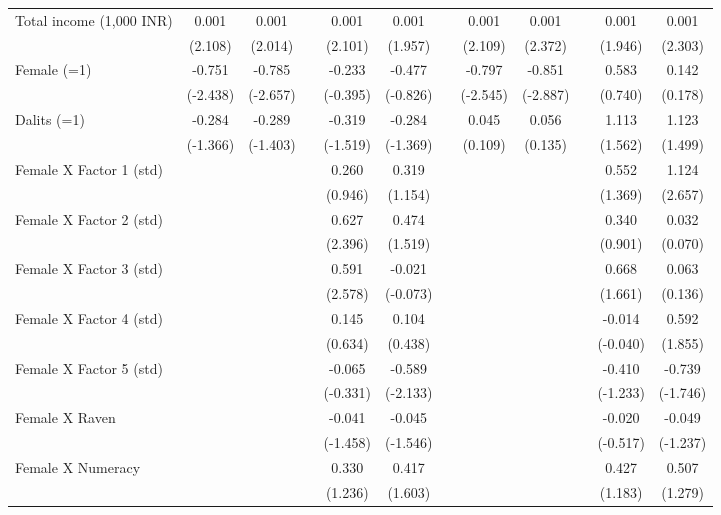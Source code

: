 {\begin{longtable}{@{\extracolsep{\fill}}lccccccccccc}
    Total income (1,000 INR) & 0.001 & 0.001 &   & 0.001 & 0.001 &   & 0.001 & 0.001 &   & 0.001 & 0.001 \\
      & (2.108) & (2.014) &   & (2.101) & (1.957) &   & (2.109) & (2.372) &   & (1.946) & (2.303) \\
    Female (=1) & -0.751 & -0.785 &   & -0.233 & -0.477 &   & -0.797 & -0.851 &   & 0.583 & 0.142 \\
      & (-2.438) & (-2.657) &   & (-0.395) & (-0.826) &   & (-2.545) & (-2.887) &   & (0.740) & (0.178) \\
    Dalits (=1) & -0.284 & -0.289 &   & -0.319 & -0.284 &   & 0.045 & 0.056 &   & 1.113 & 1.123 \\
      & (-1.366) & (-1.403) &   & (-1.519) & (-1.369) &   & (0.109) & (0.135) &   & (1.562) & (1.499) \\
    Female X Factor 1 (std) &   &   &   & 0.260 & 0.319 &   &   &   &   & 0.552 & 1.124 \\
      &   &   &   & (0.946) & (1.154) &   &   &   &   & (1.369) & (2.657) \\
    Female X Factor 2 (std) &   &   &   & 0.627 & 0.474 &   &   &   &   & 0.340 & 0.032 \\
      &   &   &   & (2.396) & (1.519) &   &   &   &   & (0.901) & (0.070) \\
    Female X Factor 3 (std) &   &   &   & 0.591 & -0.021 &   &   &   &   & 0.668 & 0.063 \\
      &   &   &   & (2.578) & (-0.073) &   &   &   &   & (1.661) & (0.136) \\
    Female X Factor 4 (std) &   &   &   & 0.145 & 0.104 &   &   &   &   & -0.014 & 0.592 \\
      &   &   &   & (0.634) & (0.438) &   &   &   &   & (-0.040) & (1.855) \\
    Female X Factor 5 (std) &   &   &   & -0.065 & -0.589 &   &   &   &   & -0.410 & -0.739 \\
      &   &   &   & (-0.331) & (-2.133) &   &   &   &   & (-1.233) & (-1.746) \\
    Female X Raven &   &   &   & -0.041 & -0.045 &   &   &   &   & -0.020 & -0.049 \\
      &   &   &   & (-1.458) & (-1.546) &   &   &   &   & (-0.517) & (-1.237) \\
    Female X Numeracy &   &   &   & 0.330 & 0.417 &   &   &   &   & 0.427 & 0.507 \\
      &   &   &   & (1.236) & (1.603) &   &   &   &   & (1.183) & (1.279) \\

\end{longtable}}
